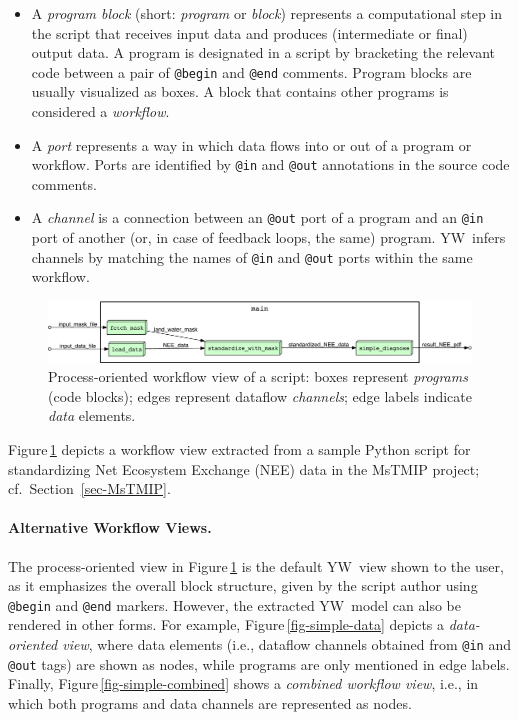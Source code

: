 \documentclass{article}
\newcommand{\yw}{\textsf{YW}}
\newcommand{\ywa}[1]{\texttt{#1}}
\newcommand{\figref}[1]{Figure\,\ref{#1}}
\begin{document}
\begin{itemize}

\item A \emph{program block} (short: \emph{program} or \emph{block})
  represents a computational step in the script that receives input
  data and produces (intermediate or final) output data. A program is
  designated in a script by bracketing the relevant code between a
  pair of \ywa{@begin} and \ywa{@end} comments. Program blocks are
  usually visualized as boxes. A block that contains other programs is
  considered a \emph{workflow}. \item A \emph{port} represents a way
  in which data flows into or out of a program or workflow. Ports are
  identified by \ywa{@in} and \ywa{@out} annotations in the source
  code comments.

\item A \emph{channel} is a connection between an \ywa{@out} port
of a program and an \ywa{@in} port of another (or, in case of feedback
loops, the same) program. \yw\ infers
channels by matching the names of \ywa{@in} and \ywa{@out} 
ports within the same workflow.
\end{itemize}

 \begin{figure}[t]
   \centering
   \includegraphics[width=1.0\textwidth]{figures/example_process-crop.pdf}
   \caption{Process-oriented workflow view of a script: boxes
     represent \emph{programs} (code blocks); edges represent dataflow
     \emph{channels}; edge labels indicate \emph{data}
     elements.}
   \label{fig-simple-process}
 \end{figure}

 \noindent \figref{fig-simple-process} depicts a workflow view
 extracted from a sample Python script for standardizing Net Ecosystem
 Exchange (NEE) data in the MsTMIP project; cf.\
 Section~\ref{sec-MsTMIP}.

\paragraph{Alternative Workflow Views.}
The process-oriented view in \figref{fig-simple-process} is the
default \yw\ view shown to the user, as it emphasizes the overall
block structure, given by the script author using \ywa{@begin} and
\ywa{@end} markers.  However, the extracted \yw\ model can also be
rendered in other forms.  For example, \figref{fig-simple-data}
depicts a \emph{data-oriented view}, where data elements (i.e.,
dataflow channels obtained from \ywa{@in} and \ywa{@out} tags) are
shown as nodes, while programs are only mentioned in edge labels.
Finally, \figref{fig-simple-combined} shows a \emph{combined workflow
  view}, i.e., in which both programs and data channels are
represented as nodes.
\end{document}
